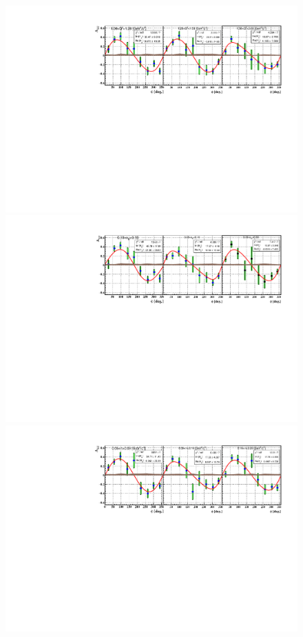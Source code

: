 \begin{figure}[tpb]
\centering
\includegraphics[scale=0.72]{fig_updated/f_coh_alu_Q2_phi.pdf} 
\includegraphics[scale=0.72]{fig_updated/f_coh_alu_xB_phi.pdf}
\includegraphics[scale=0.72]{fig_updated/f_coh_alu_t_phi.pdf}

\end{figure}
